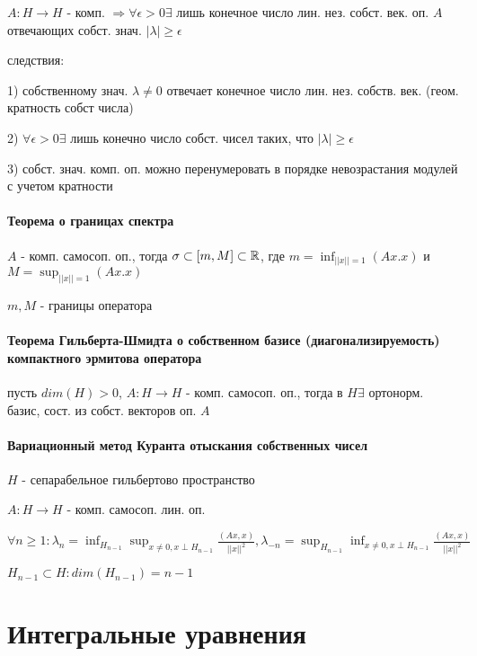 \documentclass[russian,twocolumn]{article}
\begin{document}
$A:H\to H$ - комп. $\Rightarrow \forall \epsilon > 0 \exists $ лишь конечное число лин. нез. собст. век. оп. $A$ отвечающих собст. знач. $|\lambda| \ge \epsilon$

следствия:

1) собственному знач. $\lambda \ne 0$ отвечает конечное число лин. нез. собств. век. (геом. кратность собст числа)

2) $\forall \epsilon > 0 \exists $ лишь конечно число собст. чисел таких, что $|\lambda| \ge \epsilon$

3) собст. знач. комп. оп. можно перенумеровать в порядке невозрастания модулей с учетом кратности

\paragraph{Теорема о границах спектра}

$A$ - комп. самосоп. оп., тогда $\sigma \subset [m,M] \subset \Bbb R$, где $m = \inf _{||x||=1}(Ax.x)$ и $M = \sup _{||x||=1}(Ax.x)$

$m,M$ - границы оператора

\paragraph{Теорема Гильберта-Шмидта о собственном базисе (диагонализируемость) компактного эрмитова оператора}

пусть $dim(H) > 0$, $A: H \to H$ - комп. самосоп. оп., тогда в $H \exists $ ортонорм. базис, сост. из собст. векторов оп. $A$

\paragraph{Вариационный метод Куранта отыскания собственных чисел}

$H$ - сепарабельное гильбертово пространство

$A:H \to H$ - комп. самосоп. лин. оп.

$\forall n \ge 1 : \lambda_n = \inf _{H_{n-1}} \sup _{x\ne 0, x \perp H_{n-1}} \frac{(Ax,x)}{||x||^2}, \lambda_{-n} = \sup _{H_{n-1}} \inf _{x\ne 0, x \perp H_{n-1}} \frac{(Ax,x)}{||x||^2}$

$H_{n-1} \subset H : dim(H_{n-1}) = n -1$

\section{Интегральные уравнения}
\end{document}
